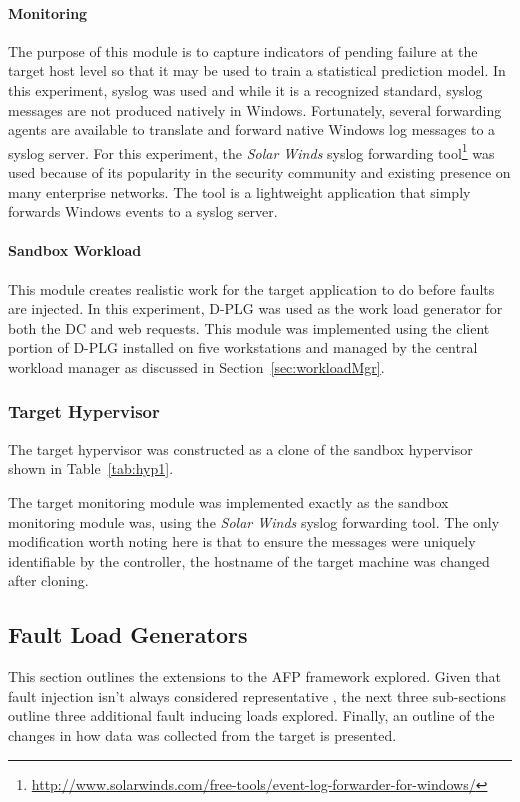 \paragraph{Monitoring} \label{sec:sandboxMonitoringTool} 
The purpose of this module is to capture indicators of pending failure at the
target host level so that it may be used to train a statistical prediction
model.  In this experiment, syslog was used and while it is a recognized
standard, syslog messages are not produced natively in Windows.  Fortunately,
several forwarding agents are available to translate and forward native Windows
log messages to a syslog server.  For this experiment, the \emph{Solar Winds}
syslog forwarding
tool\footnote{\url{http://www.solarwinds.com/free-tools/event-log-forwarder-for-windows/}}
was used because of its popularity in the security community and existing
presence on many enterprise networks.  The tool is a lightweight application
that simply forwards Windows events to a syslog server.

\paragraph{Sandbox Workload}  \label{sec:sandboxWorkload} 
This module creates realistic work for the target application to do before
faults are injected.  In this experiment, \ac{D-PLG} was used as the work load
generator for both the \ac{DC} and web requests.  This module was implemented
using the client portion of \ac{D-PLG} installed on five workstations and
managed by the central workload manager as discussed in
Section~\ref{sec:workloadMgr}.

\subsubsection{Target Hypervisor} \label{sec:target}
The target hypervisor was constructed as a clone of the sandbox hypervisor
shown in Table~\ref{tab:hyp1}. 

The target monitoring module was implemented exactly as the sandbox monitoring
module was, using the \emph{Solar Winds} syslog forwarding tool.  The only
modification worth noting here is that to ensure the messages were uniquely
identifiable by the controller, the hostname of the target machine was changed
after cloning.

\setcounter{secnumdepth}{3}

\subsection{Fault Load Generators} \label{sec:extensions}
This section outlines the extensions to the \ac{AFP} framework explored.  Given
that fault injection isn't always considered representative
\citep{kikuchi2014}, the next three sub-sections outline three additional fault
inducing loads explored.  Finally, an outline of the changes in how data was
collected from the target is presented.

